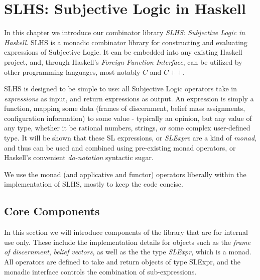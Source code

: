 \documentclass[thesis.tex]{subfiles}
\begin{document}
\chapter{SLHS: Subjective Logic in Haskell}
\label{chap:sl-in-haskell}



In this chapter we introduce our combinator library \emph{SLHS:
  Subjective Logic in Haskell}. SLHS is a monadic combinator library
for constructing and evaluating expressions of Subjective Logic. It
can be embedded into any existing Haskell project, and, through
Haskell's \emph{Foreign Function Interface}, can be utilized by other
programming languages, most notably $C$ and $C++$.

SLHS is designed to be simple to use: all Subjective Logic operators
take in \emph{expressions} as input, and return expressions as output.
An expression is simply a function, mapping some data (frames of
discernment, belief mass assignments, configuration information) to
some value - typically an opinion, but any value of any type, whether
it be rational numbers, strings, or some complex user-defined type.
It will be shown that these SL expressions, or \emph{SLExpr}s are a
kind of \emph{monad}, and thus can be used and combined using
pre-existing monad operators, or Haskell's convenient \emph{do-notation}
syntactic sugar.

We use the monad (and applicative and functor) operators liberally
within the implementation of SLHS, mostly to keep the code concise.


\section{Core Components}

In this section we will introduce components of the library that
are for internal use only. These include the implementation details
for objects such as the \emph{frame of discernment}, \emph{belief
  vectors}, as well as the the type \emph{SLExpr}, which is a monad.
All operators are defined to take and return objects of type
SLExpr, and the monadic interface controls the combination of
sub-expressions.








\end{document}
